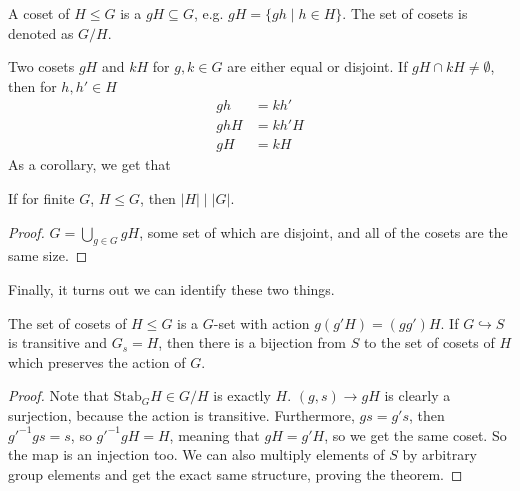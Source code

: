 \begin{definition}
    A coset of $H \leq G$ is a $gH \subseteq G$, e.g. $gH = \{gh \mid h \in H\}$.
    The set of cosets is denoted as $G/H$.
\end{definition}
Two cosets $gH$ and $kH$ for $g, k \in G$ are either equal or disjoint.
If $gH \cap kH \neq \emptyset$, then for $h, h' \in H$
\begin{align*}
    gh &= kh' \\
    ghH &= kh' H \\
    gH &= kH
\end{align*}
As a corollary, we get that
\begin{theorem}
    If for finite $G$, $H \le G$, then $|H| \mid |G|$. 
    \begin{proof}
    $G = \bigcup_{g \in G} gH$, some set of which are disjoint,
    and all of the cosets are the same size.
    \end{proof}
\end{theorem}
Finally, it turns out we can identify these two things.
\begin{theorem}
The set of cosets of $H \le G$ is a $G$-set with action $g(g'H) = (gg')H$.
If $G \hookrightarrow S$ is transitive and $G_s = H$,
then there is a bijection from $S$ to the set of cosets of $H$ which preserves
the action of $G$.
\begin{proof}
    Note that $\text{Stab}_G H \in G/H$ is exactly $H$.
    $(g, s) \to gH$ is clearly a surjection, because the action is transitive.
    Furthermore, $gs = g's$, then $g'^{-1}g s = s$, so $g'^{-1} g H = H$,
    meaning that $gH = g' H$, so we get the same coset. So the map is an injection too.
    We can also multiply elements of $S$ by arbitrary group elements and get the exact same structure, proving the theorem.
\end{proof}
\end{theorem}

